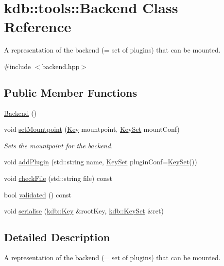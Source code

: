\hypertarget{classkdb_1_1tools_1_1Backend}{\section{kdb\-:\-:tools\-:\-:Backend Class Reference}
\label{classkdb_1_1tools_1_1Backend}
}


A representation of the backend (= set of plugins) that can be mounted.  




{\ttfamily \#include $<$backend.\-hpp$>$}

\subsection*{Public Member Functions}
\begin{DoxyCompactItemize}
\item 
\hyperlink{classkdb_1_1tools_1_1Backend_a1650b149ebf313ee8cd3472247212263}{Backend} ()
\item 
void \hyperlink{classkdb_1_1tools_1_1Backend_ac61b2628800a6fd0a6620ff47bfb3be9}{set\-Mountpoint} (\hyperlink{classkdb_1_1Key}{Key} mountpoint, \hyperlink{classkdb_1_1KeySet}{Key\-Set} mount\-Conf)
\begin{DoxyCompactList}\small\item\em Sets the mountpoint for the backend. \end{DoxyCompactList}\item 
void \hyperlink{classkdb_1_1tools_1_1Backend_ab9926bd1bbbc095b09a0a6666058cd05}{add\-Plugin} (std\-::string name, \hyperlink{classkdb_1_1KeySet}{Key\-Set} plugin\-Conf=\hyperlink{classkdb_1_1KeySet}{Key\-Set}())
\item 
void \hyperlink{classkdb_1_1tools_1_1Backend_a26a0899dac268e6d8ced1d7003cd694c}{check\-File} (std\-::string file) const 
\item 
bool \hyperlink{classkdb_1_1tools_1_1Backend_ad2b145e2ac9a4f276714d0d982583e03}{validated} () const 
\item 
void \hyperlink{classkdb_1_1tools_1_1Backend_acb6f43d0d7eaf40570c37564aa0f3c53}{serialise} (\hyperlink{classkdb_1_1Key}{kdb\-::\-Key} \&root\-Key, \hyperlink{classkdb_1_1KeySet}{kdb\-::\-Key\-Set} \&ret)
\end{DoxyCompactItemize}


\subsection{Detailed Description}
A representation of the backend (= set of plugins) that can be mounted. 

